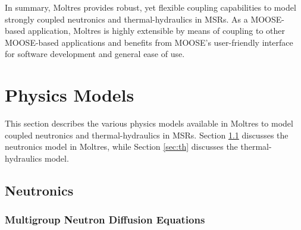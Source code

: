In summary, Moltres provides robust, yet flexible coupling capabilities to
model strongly coupled neutronics and thermal-hydraulics in \glspl{MSR}. As a
MOOSE-based application, Moltres is highly extensible by means of coupling to
other MOOSE-based applications and benefits from MOOSE's user-friendly
interface for software development and general ease of use.

\section{Physics Models} \label{sec:moltres-physics}

This section describes the various physics models available in Moltres to model
coupled neutronics and thermal-hydraulics in \glspl{MSR}. Section \ref{sec:nts}
discusses the neutronics model in Moltres, while Section \ref{sec:th} discusses
the thermal-hydraulics model.

\subsection{Neutronics} \label{sec:nts}

\subsubsection{Multigroup Neutron Diffusion Equations}

